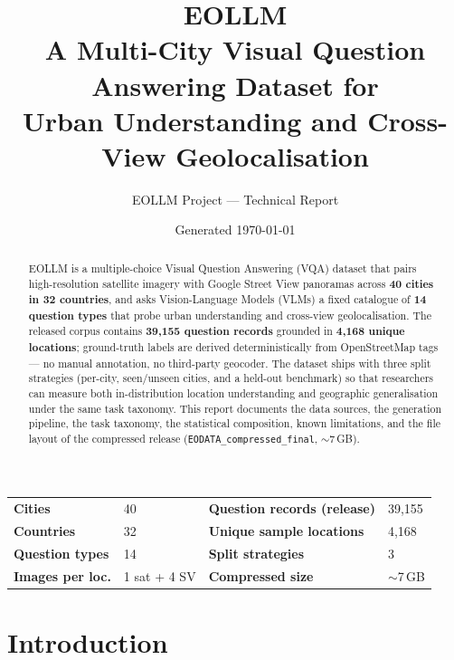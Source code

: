 \documentclass[11pt,a4paper]{article}
\title{\vspace{-1.2cm}\textcolor{eollmblue}{\textbf{EOLLM}}\\
       \large A Multi-City Visual Question Answering Dataset for\\
       Urban Understanding and Cross-View Geolocalisation}
\author{EOLLM Project --- Technical Report}
\date{Generated \today}
\begin{document}
\maketitle
\thispagestyle{empty}
\vspace{-1em}

\begin{abstract}
\noindent
EOLLM is a multiple-choice Visual Question Answering (VQA) dataset that pairs
high-resolution satellite imagery with Google Street View panoramas
across \textbf{40 cities in 32 countries}, and asks Vision-Language Models
(VLMs) a fixed catalogue of \textbf{14 question types} that probe urban
understanding and cross-view geolocalisation. The released corpus contains
\textbf{39{,}155 question records} grounded in \textbf{4{,}168 unique
locations}; ground-truth labels are derived deterministically from
OpenStreetMap tags --- no manual annotation, no third-party geocoder. The
dataset ships with three split strategies (per-city, seen/unseen cities, and
a held-out benchmark) so that researchers can measure both
in-distribution location understanding and geographic generalisation under
the same task taxonomy. This report documents the data sources, the
generation pipeline, the task taxonomy, the statistical composition, known
limitations, and the file layout of the compressed release
(\texttt{EODATA\_compressed\_final}, $\sim$7\,GB).
\end{abstract}

\begin{infobox}[At a glance]
\begin{tabularx}{\linewidth}{@{}lXlX@{}}
\textbf{Cities}            & 40   & \textbf{Question records (release)} & 39{,}155 \\
\textbf{Countries}         & 32   & \textbf{Unique sample locations}    & 4{,}168 \\
\textbf{Question types}    & 14   & \textbf{Split strategies}           & 3 \\
\textbf{Images per loc.}   & 1 sat + 4 SV & \textbf{Compressed size}    & $\sim$7\,GB \\
\end{tabularx}
\end{infobox}

\tableofcontents
\newpage

\section{Introduction}
\end{document}
